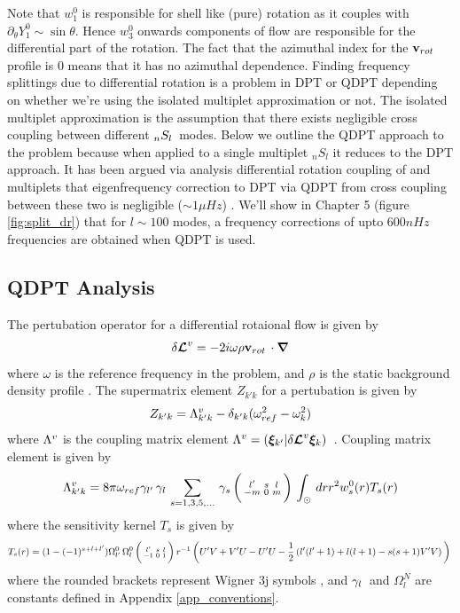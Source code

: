 Note that $w_1^0$ is responsible for shell like (pure) rotation as it couples with $\partial_{\theta} Y_1^0 \sim \sin\theta$. Hence $w_3^0$ onwards components of flow are responsible for the differential part of the rotation. The fact that the azimuthal index for the $\mathbf{v}_{rot}\,$ profile is $0$ means that it has no azimuthal dependence. Finding frequency splittings due to differential rotation is a problem in DPT or QDPT depending on whether we're using the isolated multiplet approximation or not. The isolated multiplet approximation is the assumption that there exists negligible cross coupling between different $_{n}S_{l}\,$ modes. 
Below we outline the QDPT approach to the problem because when applied to a single multiplet $_n S_l$ it reduces to the DPT approach. It has been argued via analysis differential rotation coupling of  and  multiplets that eigenfrequency correction to DPT via QDPT from cross coupling between these two is negligible ($\sim 1 \mu Hz$) \cite{lavely92}. We'll show in Chapter 5 (figure \ref{fig:split_dr}) that for $l\sim 100$ modes, a frequency corrections of upto $600 nHz$ frequencies are obtained when QDPT is used.


\subsection{QDPT Analysis}
The pertubation operator \dLd for a differential rotaional flow is given by 
\begin{equation}
\delta \bm{\mathcal{L}}^{v} = -2i \omega \rho \mathbf{v}_{rot}\, \cdot \bm{\nabla}
\end{equation}
where $\omega$ is the reference frequency in the problem, and $\rho$ is the static background density profile \cite{ritzwoller}.
The supermatrix element $Z_{k' k}$ for a pertubation \dLd is given by
\begin{equation}
Z_{k' k} = \Lambda^{v}_{k'k} - \delta_{k'k} (\omega_{ref}^2 - \omega_k^2)
\end{equation}
where $\Lambda^{v}$ is the coupling matrix element $\Lambda^{v} = (\bm{\xi}_{k'}|\delta \bm{\mathcal{L}}^{v} \bm{\xi}_{k})\,$ .
Coupling matrix element is given by
\begin{equation}
\Lambda^{v}_{k'k} = 8 \pi \omega_{ref} \gamma_{l'}\,\gamma_{l}\, \sum_{s=1,3,5,...}\, \gamma_{s}\, \bigg(\begin{smallmatrix} l' & s & l \\ -m & 0 & m \end{smallmatrix}\bigg)\, \int_{\odot} \, dr 
r^2 w_s^0(r) T_s(r)
\end{equation}
where the sensitivity kernel $T_s$ is given by
\begin{dmath}
T_s(r) = (1-(-1)^{s+l+l'}) \om{l'}{0} \om{l}{0} \wigred{-1}{0}{1} r^{-1}
 \enc{U'V+V'U-U'U-\frac{1}{2}\enc{l'(l'+1) + l(l+1) - s(s+1) V'V}}
\end{dmath}
where the rounded brackets represent Wigner 3j symbols \cite{ritzwoller}, and $\gamma_{l}\,$ and $\Omega_{l}^{N}$ are constants defined in Appendix \ref{app_conventions}.
